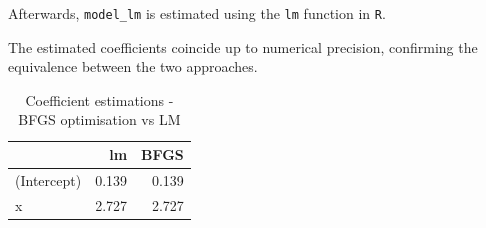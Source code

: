 \documentclass[12pt,letterpaper]{article}
\begin{document}
\vspace{.5cm}
 

\vspace{0.5cm}
\noindent Afterwards, \texttt{model\_lm} is estimated using the \texttt{lm} function in \texttt{R}.

\vspace{.5cm}
 

\vspace{0.5cm}
\noindent The estimated coefficients coincide up to numerical precision, confirming the equivalence between the two approaches.

\vspace{0.5cm}

\begin{table}[H]
	\centering
	\caption{Coefficient estimations - BFGS optimisation vs LM}
	\centering
	\begin{tabular}[t]{lrr}
		\toprule
		& lm & BFGS\\
		\midrule
		(Intercept) & 0.139 & 0.139\\
		x & 2.727 & 2.727\\
		\bottomrule
	\end{tabular}
\end{table}
\end{document}
